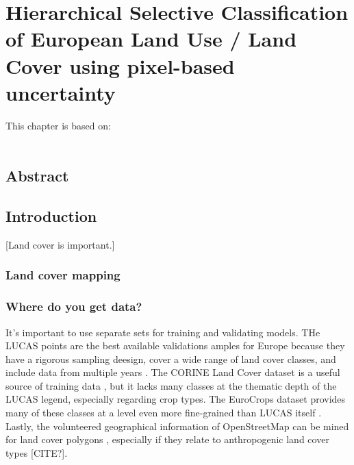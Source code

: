 \chapter[Hierarchical Selective Classification]{Hierarchical Selective Classification of European Land Use / Land Cover using pixel-based uncertainty}
\label{cha:chapter4}
\vspace*{\fill}
This chapter is based on:
\\
\\
\newpage

\section*{Abstract}


\newpage

\section{Introduction}
[Land cover is important.]

\subsection{Land cover mapping}

    \subsection{Where do you get data?}

        It's important to use separate sets for training and validating models. THe LUCAS points are the best available validations amples for Europe because they have a rigorous sampling deesign, cover a wide range of land cover classes, and include data from multiple years \citep{dandrimont2020harmonised,dandrimont2021lucas,venter2022global}. The CORINE Land Cover dataset is a useful source of training data \citep{witjes2022spatiotemporal,witjes2024iterative}, but it lacks many classes at the thematic depth of the LUCAS legend, especially regarding crop types.
        The EuroCrops dataset provides many of these classes at a level even more fine-grained than LUCAS itself \citep{schneider2023eurocrops}. Lastly, the volunteered geographical information of OpenStreetMap can be mined for land cover polygons \citep{witjes2022spatiotemporal}, especially if they relate to anthropogenic land cover types [CITE?]. 
        
